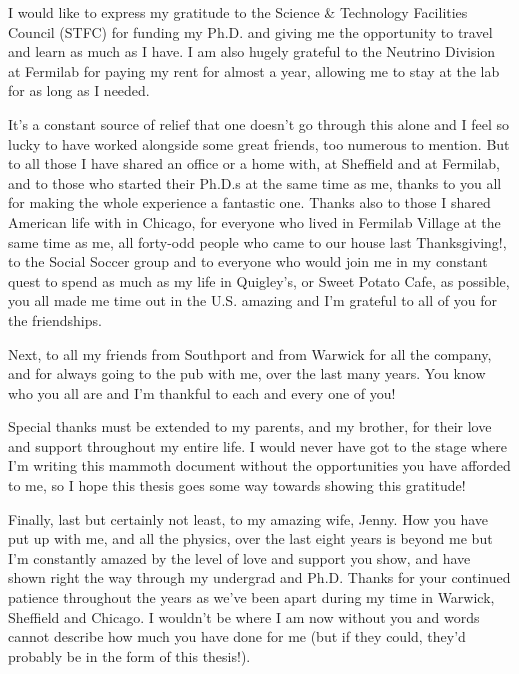 I would like to express my gratitude to the Science \& Technology Facilities Council (STFC) for funding my Ph.D. and giving me the opportunity to travel and learn as much as I have.  I am also hugely grateful to the Neutrino Division at Fermilab for paying my rent for almost a year, allowing me to stay at the lab for as long as I needed.

It's a constant source of relief that one doesn't go through this alone and I feel so lucky to have worked alongside some great friends, too numerous to mention.  But to all those I have shared an office or a home with, at Sheffield and at Fermilab, and to those who started their Ph.D.s at the same time as me, thanks to you all for making the whole experience a fantastic one.  Thanks also to those I shared American life with in Chicago, for everyone who lived in Fermilab Village at the same time as me, all forty-odd people who came to our house last Thanksgiving!, to the Social Soccer group and to everyone who would join me in my constant quest to spend as much as my life in Quigley's, or Sweet Potato Cafe, as possible, you all made me time out in the U.S. amazing and I'm grateful to all of you for the friendships.

Next, to all my friends from Southport and from Warwick for all the company, and for always going to the pub with me, over the last many years.  You know who you all are and I'm thankful to each and every one of you!

Special thanks must be extended to my parents, and my brother, for their love and support throughout my entire life.  I would never have got to the stage where I'm writing this mammoth document without the opportunities you have afforded to me, so I hope this thesis goes some way towards showing this gratitude!

Finally, last but certainly not least, to my amazing wife, Jenny.  How you have put up with me, and all the physics, over the last eight years is beyond me but I'm constantly amazed by the level of love and support you show, and have shown right the way through my undergrad and Ph.D.  Thanks for your continued patience throughout the years as we've been apart during my time in Warwick, Sheffield and Chicago.  I wouldn't be where I am now without you and words cannot describe how much you have done for me (but if they could, they'd probably be in the form of this thesis!).
